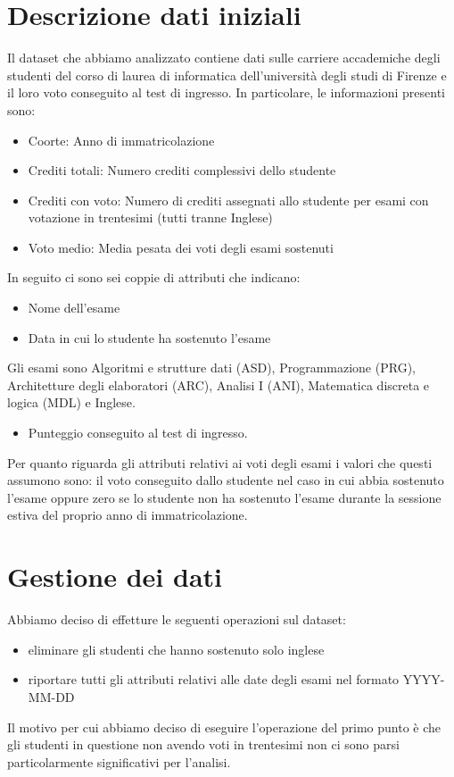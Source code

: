 \documentclass[12pt]{article}
\begin{document}
\section{Descrizione dati iniziali}
Il dataset che abbiamo analizzato contiene dati sulle carriere accademiche degli studenti del corso di laurea di informatica dell'università degli studi di Firenze e il loro voto conseguito 
al test di ingresso. 
In particolare, le informazioni presenti sono:
\begin{itemize}
	\item Coorte: Anno di immatricolazione
	\item Crediti totali: Numero crediti complessivi dello studente
	\item Crediti con voto: Numero di crediti assegnati allo studente per esami con votazione in trentesimi (tutti tranne Inglese)
	\item Voto medio: Media pesata dei voti degli esami sostenuti
\end{itemize}
In seguito ci sono sei coppie di attributi che indicano:
\begin{itemize}
	\item Nome dell'esame
	\item Data in cui lo studente ha sostenuto l'esame
\end{itemize}
Gli esami sono Algoritmi e strutture dati (ASD), Programmazione (PRG), Architetture degli elaboratori (ARC), Analisi I (ANI), Matematica discreta e logica (MDL) e Inglese.
\begin{itemize}
	\item Punteggio conseguito al test di ingresso.
\end{itemize}
Per quanto riguarda gli attributi relativi ai voti degli esami i valori che questi assumono sono:
il voto conseguito dallo studente nel caso in cui abbia sostenuto l'esame oppure
zero se lo studente non ha sostenuto l'esa\-me durante la sessione estiva del proprio anno di immatricolazione.
\newpage
\section{Gestione dei dati}
Abbiamo deciso di effetture le seguenti operazioni sul dataset:
\begin{itemize}
	\item eliminare gli studenti che hanno sostenuto solo inglese
	\item riportare tutti gli attributi relativi alle date degli esami nel formato YYYY-MM-DD
\end{itemize}
Il motivo per cui abbiamo deciso di eseguire l'operazione del primo punto è che gli studenti in questione non avendo voti in trentesimi non ci sono parsi particolarmente significativi per l'analisi.
\end{document}
